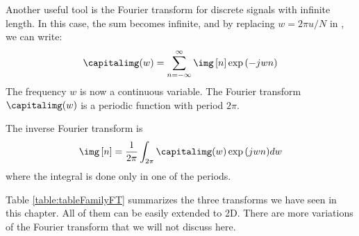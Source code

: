 Another useful tool is the Fourier transform for discrete signals with infinite length. In this case, the sum becomes infinite, and by replacing $w = 2 \pi u / N$ in \eqn{\ref{eq:fourier}}, we can write:
\begin{equation}
	\capitalimg (w) = \sum_{n=-\infty}^{\infty} \img \left[n \right] \exp{(- j w n)}
\end{equation}
The frequency $w$ is now a continuous variable. The Fourier transform $\capitalimg (w)$ is a periodic function with period $2 \pi$.

The inverse Fourier transform is
\begin{equation}
	\img \left[n \right] = \frac{1}{2\pi} \int_{2 \pi} \capitalimg (w) \exp{(j w n)} d w
\end{equation}
where the integral is done only in one of the periods.

Table \ref{table:tableFamilyFT} summarizes the three transforms we have seen in this chapter. All of them can be easily extended to 2D. There are more variations of the Fourier transform that we will not discuss here.


